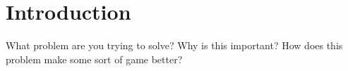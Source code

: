 \section{Introduction}
\label{01}

What problem are you trying to solve? Why is this important? How does this problem make some sort of game better?